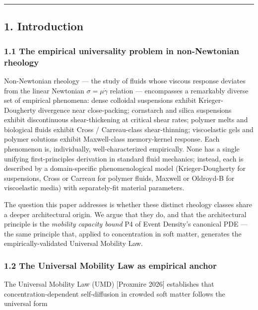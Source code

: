 \documentclass[
  11pt,a4paper]{article}
\begin{document}
\begin{center}\rule{0.5\linewidth}{0.5pt}\end{center}

\subsection{1. Introduction}\label{introduction}

\subsubsection{1.1 The empirical universality problem in non-Newtonian
rheology}\label{the-empirical-universality-problem-in-non-newtonian-rheology}

Non-Newtonian rheology --- the study of fluids whose viscous response
deviates from the linear Newtonian \(\sigma = \mu \dot\gamma\) relation
--- encompasses a remarkably diverse set of empirical phenomena: dense
colloidal suspensions exhibit Krieger-Dougherty divergence near
close-packing; cornstarch and silica suspensions exhibit discontinuous
shear-thickening at critical shear rates; polymer melts and biological
fluids exhibit Cross / Carreau-class shear-thinning; viscoelastic gels
and polymer solutions exhibit Maxwell-class memory-kernel response. Each
phenomenon is, individually, well-characterized empirically. None has a
single unifying first-principles derivation in standard fluid mechanics;
instead, each is described by a domain-specific phenomenological model
(Krieger-Dougherty for suspensions, Cross or Carreau for polymer fluids,
Maxwell or Oldroyd-B for viscoelastic media) with separately-fit
material parameters.

The question this paper addresses is whether these distinct rheology
classes share a deeper architectural origin. We argue that they do, and
that the architectural principle is the \emph{mobility capacity bound}
P4 of Event Density's canonical PDE --- the same principle that, applied
to concentration in soft matter, generates the empirically-validated
Universal Mobility Law.

\subsubsection{1.2 The Universal Mobility Law as empirical
anchor}\label{the-universal-mobility-law-as-empirical-anchor}

The Universal Mobility Law (UMD) {[}Proxmire 2026{]} establishes that
concentration-dependent self-diffusion in crowded soft matter follows
the universal form
\end{document}
